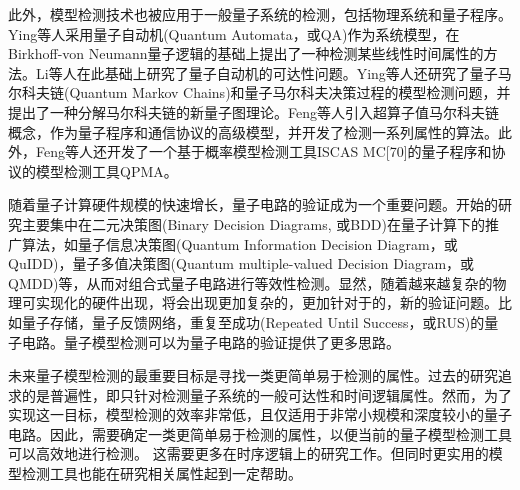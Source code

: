 此外，模型检测技术也被应用于一般量子系统的检测，包括物理系统和量子程序。Ying等人采用量子自动机(Quantum Automata，或QA)作为系统模型\citep{kondacs1997power}，在Birkhoff-von Neumann量子逻辑\citep{birkhoff1987logic}的基础上提出了一种检测某些线性时间属性的方法\citep{ying2014model}。Li等人在此基础上研究了量子自动机的可达性问题\citep{li2014decidable}。Ying等人还研究了量子马尔科夫链(Quantum Markov Chains)\citep{ying2013verification}和量子马尔科夫决策过程的模型检测问题，并提出了一种分解马尔科夫链的新量子图理论\citep{ying2013reachability,ying2018reachability}。Feng等人引入超算子值马尔科夫链概念，作为量子程序和通信协议的高级模型，并开发了检测一系列属性的算法\citep{feng2013model,feng2013reachability,feng2017model}。此外，Feng等人还开发了一个基于概率模型检测工具ISCAS MC[70]\citep{hahn2014iscas}的量子程序和协议的模型检测工具QPMA\citep{feng2015qpmc}。

随着量子计算硬件规模的快速增长，量子电路的验证成为一个重要问题。开始的研究主要集中在二元决策图(Binary Decision Diagrams, 或BDD)在量子计算下的推广算法，如量子信息决策图(Quantum Information Decision Diagram，或QuIDD)\citep{Viamontes_2003}，量子多值决策图(Quantum multiple-valued Decision Diagram，或QMDD)\citep{Seiter_2013}等，从而对组合式量子电路进行等效性检测。显然，随着越来越复杂的物理可实现化的硬件出现，将会出现更加复杂的，更加针对于的，新的验证问题。比如量子存储\citep{Kerckhoff_2010}，量子反馈网络\citep{Gough_2008}，重复至成功(Repeated Until Success，或RUS)的量子电路\citep{Bocharov_2015}。量子模型检测可以为量子电路的验证提供了更多思路。


未来量子模型检测的最重要目标是寻找一类更简单易于检测的属性。过去的研究追求的是普遍性，即只针对检测量子系统的一般可达性和时间逻辑属性。然而，为了实现这一目标，模型检测的效率非常低，且仅适用于非常小规模和深度较小的量子电路。因此，需要确定一类更简单易于检测的属性，以便当前的量子模型检测工具可以高效地进行检测\citep{ying2021model}。
这需要更多在时序逻辑上的研究工作。但同时更实用的模型检测工具也能在研究相关属性起到一定帮助。




